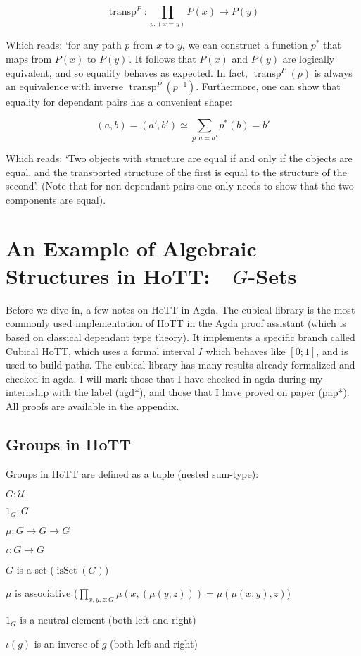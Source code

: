 \documentclass{article}
\DeclareMathOperator{\transp}{transp}
\DeclareMathOperator{\isset}{isSet}
\begin{document}
\[\transp^{P} : \prod_{p : (x = y)} P(x) \to P(y) \]

Which reads: `for any path $p$ from $x$ to $y$, we can construct a function $p^{*}$ that maps from $P(x)$ to $P(y)$'. It follows that $P(x)$ and $P(y)$ are logically equivalent, and so equality behaves as expected. In fact, $\transp^{P}(p)$ is always an equivalence with inverse $\transp^{P}(p^{-1})$. Furthermore, one can show that equality for dependant pairs has a convenient shape:

\[(a, b) = (a', b') \simeq \sum_{p : a = a'}p^*(b) = b'\]

Which reads: `Two objects with structure are equal if and only if the objects are equal, and the transported structure of the first is equal to the structure of the second'. (Note that for non-dependant pairs one only needs to show that the two components are equal).

\section{An Example of Algebraic Structures in HoTT:\  $G$-Sets}

Before we dive in, a few notes on HoTT in Agda. The cubical library is the most commonly used implementation of HoTT in the Agda proof assistant (which is based on classical dependant type theory). It implements a specific branch called Cubical HoTT, which uses a formal interval $I$ which behaves like $[0;1]$, and is used to build paths. The cubical library has many results already formalized and checked in agda. I will mark those that I have checked in agda during my internship with the label (agd*), and those that I have proved on paper (pap*). All proofs are available in the appendix.


\subsection{Groups in HoTT}

Groups in HoTT are defined as a tuple (nested sum-type):

\begin{itemize}
\begin{minipage}[c][3.2cm]{0.3\linewidth}
    \item $G : \mathcal{U}$
    \item $1_{G} : G$
    \item $\mu : G \to G \to G$
    \item $\iota : G \to G$
\end{minipage}
\begin{minipage}[c][3.2cm]{0.6\linewidth}
    \item $G$ is a set ($\isset(G)$)
    \item $\mu$ is associative ($\prod_{x,y,z : G} \mu(x,(\mu(y,z))) = \mu(\mu(x,y),z)$)
    \item $1_{G}$ is a neutral element (both left and right)
    \item $\iota(g)$ is an inverse of $g$ (both left and right)
\end{minipage}
\end{itemize}
\end{document}
